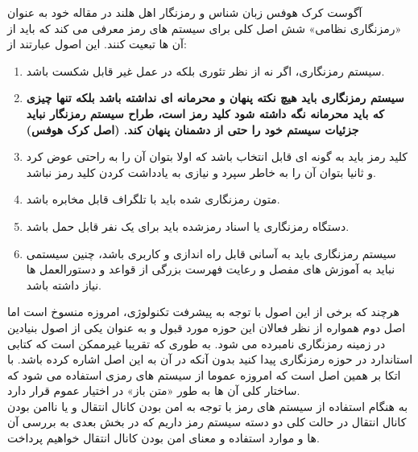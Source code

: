 \documentclass[12pt]{report}
\begin{document}
آگوست کرک هوفس زبان شناس و رمزنگار اهل هلند در مقاله خود به عنوان 
«رمزنگاری نظامی»
\cite{kerckhoffs-1883}
شش اصل کلی برای سیستم های رمز معرفی می کند که باید از آن ها تبعیت کنند. 
این اصول عبارتند از:

\begin{enumerate}[leftmargin=*]
    \item سیستم رمزنگاری، اگر نه از نظر تئوری بلکه در عمل غیر قابل شکست باشد.
    
    \item \textbf{سیستم رمزنگاری باید هیچ نکته پنهان و محرمانه ای نداشته باشد بلکه تنها چیزی که باید 
    محرمانه نگه داشته شود کلید رمز است، طراح سیستم رمزنگار نباید جزئیات سیستم خود را حتی از دشمنان 
    پنهان کند. (اصل کرک هوفس)}
    
    \item کلید رمز باید به گونه ای قابل انتخاب باشد که اولا بتوان آن را به راحتی عوض کرد و ثانیا 
    بتوان آن را به خاطر سپرد و نیازی به یادداشت کردن کلید رمز نباشد.
    
    \item متون رمزنگاری شده باید با تلگراف قابل مخابره باشد.
    
    \item دستگاه رمزنگاری یا اسناد رمزشده باید برای یک نفر قابل حمل باشد.
    
    \item سیستم رمزنگاری باید به آسانی قابل راه اندازی و کاربری باشد، چنین سیستمی نباید به آموزش های 
    مفصل و رعایت فهرست بزرگی از قواعد و دستورالعمل ها نیاز داشته باشد.
\end{enumerate}
\noindent
هرچند که برخی از این اصول با توجه به پیشرفت تکنولوژی، امروزه منسوخ است اما اصل دوم همواره از نظر فعالان 
این حوزه مورد قبول و به عنوان یکی از اصول بنیادین در زمینه رمزنگاری نامبرده می شود. به طوری که تقریبا 
غیرممکن است که کتابی استاندارد در حوزه رمزنگاری پیدا کنید بدون آنکه در آن به این اصل اشاره کرده باشد. 
با اتکا بر همین اصل است که امروزه عموما از سیستم های رمزی استفاده می شود که ساختار کلی آن ها به طور 
«متن باز» در اختیار عموم قرار دارد.
\\\noindent
به هنگام استفاده از سیستم های رمز با توجه به امن بودن کانال انتقال و یا ناامن بودن کانال انتقال در 
حالت کلی دو دسته سیستم رمز داریم که در بخش بعدی به بررسی آن ها و موارد استفاده و معنای امن بودن کانال 
انتقال خواهیم پرداخت.

\newpage

\end{document}
